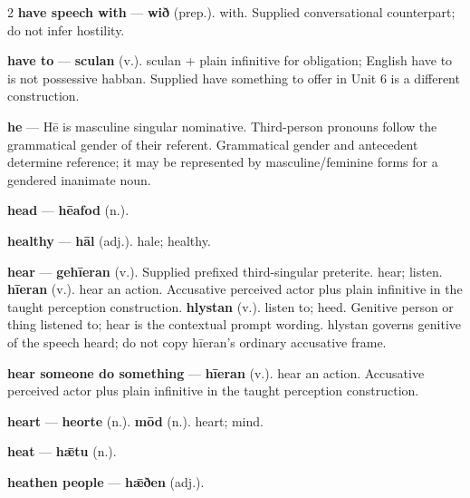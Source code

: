 \begin{multicols}{2}
\textbf{have speech with} — \textbf{wið} (prep.). with. Supplied conversational counterpart; do not infer hostility.\par
\textbf{have to} — \textbf{sculan} (v.). sculan + plain infinitive for obligation; English have to is not possessive habban. Supplied have something to offer in Unit 6 is a different construction.\par
\textbf{he} — Hē is masculine singular nominative. Third-person pronouns follow the grammatical gender of their referent. Grammatical gender and antecedent determine reference; it may be represented by masculine/feminine forms for a gendered inanimate noun.\par
\textbf{head} — \textbf{hēafod} (n.).\par
\textbf{healthy} — \textbf{hāl} (adj.). hale; healthy.\par
\textbf{hear} — \textbf{gehīeran} (v.). Supplied prefixed third-singular preterite. hear; listen. \textbf{hīeran} (v.). hear an action. Accusative perceived actor plus plain infinitive in the taught perception construction. \textbf{hlystan} (v.). listen to; heed. Genitive person or thing listened to; hear is the contextual prompt wording. hlystan governs genitive of the speech heard; do not copy hīeran's ordinary accusative frame.\par
\textbf{hear someone do something} — \textbf{hīeran} (v.). hear an action. Accusative perceived actor plus plain infinitive in the taught perception construction.\par
\textbf{heart} — \textbf{heorte} (n.).  \textbf{mōd} (n.). heart; mind.\par
\textbf{heat} — \textbf{hǣtu} (n.).\par
\textbf{heathen people} — \textbf{hǣðen} (adj.).\par

\end{multicols}
